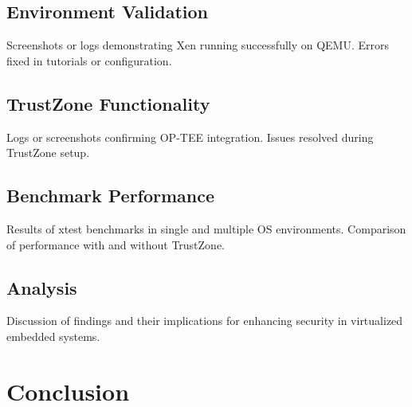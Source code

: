 \documentclass[acmtog]{acmart}
\begin{document}
\subsection{Environment Validation}
Screenshots or logs demonstrating Xen running successfully on QEMU.
Errors fixed in tutorials or configuration.

\subsection{TrustZone Functionality}
Logs or screenshots confirming OP-TEE integration.
Issues resolved during TrustZone setup.

\subsection{Benchmark Performance}
Results of xtest benchmarks in single and multiple OS environments.
Comparison of performance with and without TrustZone.

\subsection{Analysis}
Discussion of findings and their implications for enhancing security in virtualized embedded systems.


\section{Conclusion}





\end{document}
